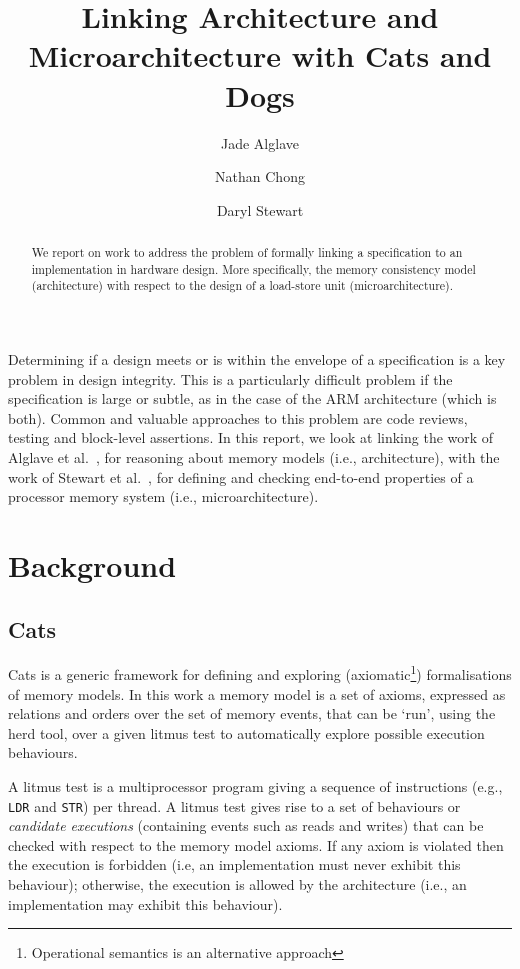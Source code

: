 \documentclass[10pt]{paper}
\begin{document}
\title{Linking Architecture and Microarchitecture with Cats and Dogs}
\author{Jade Alglave\and Nathan Chong\and Daryl Stewart}
\maketitle

\begin{abstract}
We report on work to address the problem of formally linking a specification to an implementation in hardware design.
%
More specifically, the memory consistency model (architecture) with respect to the design of a load-store unit (microarchitecture).
\end{abstract}

Determining if a design meets or is within the envelope of a specification is a key problem in design integrity.
%
This is a particularly difficult problem if the specification is large or subtle, as in the case of the ARM architecture (which is both).
%
Common and valuable approaches to this problem are code reviews, testing and block-level assertions.
%
In this report, we look at linking the work of Alglave et al.~\cite{cats}, for reasoning about memory models (i.e., architecture), with the work of Stewart et al.~\cite{dogs}, for defining and checking end-to-end properties of a processor memory system (i.e., microarchitecture).

\section{Background}

\subsection{Cats}

Cats is a generic framework for defining and exploring (axiomatic\footnote{Operational semantics is an alternative approach}) formalisations of memory models.
%
In this work a memory model is a set of axioms, expressed as relations and orders over the set of memory events, that can be `run', using the herd tool, over a given litmus test to automatically explore possible execution behaviours.

A litmus test is a multiprocessor program giving a sequence of instructions (e.g., \texttt{LDR} and \texttt{STR}) per thread.
%
A litmus test gives rise to a set of behaviours or \emph{candidate executions} (containing events such as reads and writes) that can be checked with respect to the memory model axioms.
%
If any axiom is violated then the execution is forbidden (i.e, an implementation must never exhibit this behaviour); otherwise, the execution is allowed by the architecture (i.e., an implementation may exhibit this behaviour).
\end{document}
